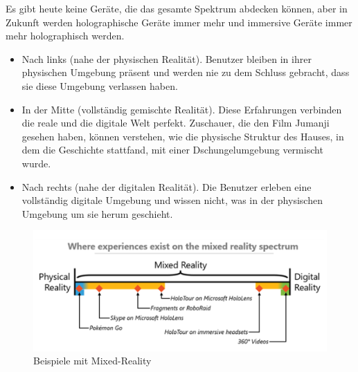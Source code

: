 Es gibt heute keine Geräte, die das gesamte Spektrum abdecken können, aber in Zukunft werden holographische Geräte immer mehr und immersive Geräte immer mehr holographisch werden.
\begin{itemize}
	\item Nach links (nahe der physischen Realität). Benutzer bleiben in ihrer physischen Umgebung präsent und werden nie zu dem Schluss gebracht, dass sie diese Umgebung verlassen haben.
	\item In der Mitte (vollständig gemischte Realität). Diese Erfahrungen verbinden die reale und die digitale Welt perfekt. Zuschauer, die den Film Jumanji gesehen haben, können verstehen, wie die physische Struktur des Hauses, in dem die Geschichte stattfand, mit einer Dschungelumgebung vermischt wurde.
	\item Nach rechts (nahe der digitalen Realität). Die Benutzer erleben eine vollständig digitale Umgebung und wissen nicht, was in der physischen Umgebung um sie herum geschieht.
\end{itemize}

\begin{figure}[ht]
	\centering
	\includegraphics[width=\textwidth,height=\textheight,keepaspectratio]{images/Beispiele mit Mixed-Reality.png}
	\caption{Beispiele mit Mixed-Reality}
	\label{Mixed-Reality1}
\end{figure}

